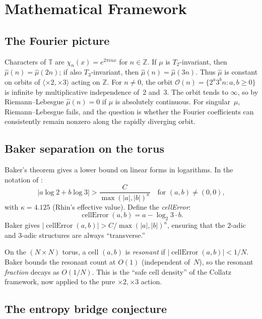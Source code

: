 \documentclass[11pt,a4paper]{article}
\begin{document}
\section{Mathematical Framework}

\subsection{The Fourier picture}

Characters of $\mathbb{T}$ are $\chi_n(x) = e^{2\pi i n x}$ for
$n \in \mathbb{Z}$.
If $\mu$ is $T_2$-invariant, then $\hat\mu(n) = \hat\mu(2n)$;
if also $T_3$-invariant, then $\hat\mu(n) = \hat\mu(3n)$.
Thus $\hat\mu$ is constant on orbits of $\langle \times 2, \times 3 \rangle$
acting on $\mathbb{Z}$.
For $n \neq 0$, the orbit $\mathcal{O}(n) = \{2^a 3^b n : a, b \geq 0\}$
is infinite by multiplicative independence of~2 and~3.
The orbit tends to $\infty$, so by Riemann--Lebesgue
$\hat\mu(n) = 0$ if $\mu$ is absolutely continuous.
For singular~$\mu$, Riemann--Lebesgue fails, and the question is
whether the Fourier coefficients can consistently remain nonzero
along the rapidly diverging orbit.

\subsection{Baker separation on the torus}

Baker's theorem \cite{baker1966} gives a lower bound on linear forms
in logarithms.  In the notation of \cite{rhin1987}:
\[
|a \log 2 + b \log 3| > \frac{C}{\max(|a|, |b|)^\kappa}
\quad\text{for } (a,b) \neq (0,0),
\]
with $\kappa = 4.125$ (Rhin's effective value).
Define the \emph{cellError}:
\[
\operatorname{cellError}(a, b) = a - \log_2 3 \cdot b.
\]
Baker gives $|\operatorname{cellError}(a,b)| > C / \max(|a|,|b|)^\kappa$,
ensuring that the 2-adic and 3-adic structures are always ``transverse.''

On the $(N \times N)$ torus, a cell $(a,b)$ is \emph{resonant} if
$|\operatorname{cellError}(a,b)| < 1/N$.
Baker bounds the resonant count at $O(1)$ (independent of~$N$),
so the resonant \emph{fraction} decays as $O(1/N)$.
This is the ``safe cell density'' of the Collatz framework,
now applied to the pure $\times 2, \times 3$ action.

\subsection{The entropy bridge conjecture}
\end{document}
